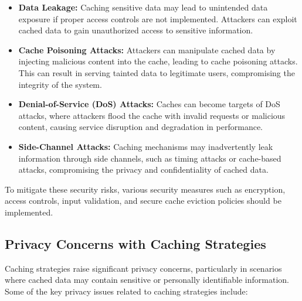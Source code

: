 \documentclass[12pt]{book} %
\begin{document}
\begin{itemize}
    \item \textbf{Data Leakage:} Caching sensitive data may lead to unintended data exposure if proper access controls are not implemented. Attackers can exploit cached data to gain unauthorized access to sensitive information.
    
    \item \textbf{Cache Poisoning Attacks:} Attackers can manipulate cached data by injecting malicious content into the cache, leading to cache poisoning attacks. This can result in serving tainted data to legitimate users, compromising the integrity of the system.
    
    \item \textbf{Denial-of-Service (DoS) Attacks:} Caches can become targets of DoS attacks, where attackers flood the cache with invalid requests or malicious content, causing service disruption and degradation in performance.
    
    \item \textbf{Side-Channel Attacks:} Caching mechanisms may inadvertently leak information through side channels, such as timing attacks or cache-based attacks, compromising the privacy and confidentiality of cached data.
\end{itemize}

To mitigate these security risks, various security measures such as encryption, access controls, input validation, and secure cache eviction policies should be implemented.

\subsection{Privacy Concerns with Caching Strategies}
Caching strategies raise significant privacy concerns, particularly in scenarios where cached data may contain sensitive or personally identifiable information. Some of the key privacy issues related to caching strategies include:
\end{document}
